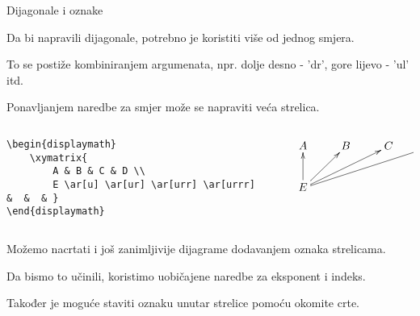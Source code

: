 \begin{frame}{Dijagonale i oznake}

Da bi napravili dijagonale, potrebno je koristiti više od jednog smjera.\newline

To se postiže kombiniranjem argumenata, npr. dolje desno - 'dr', gore lijevo - 'ul' itd.\newline

Ponavljanjem naredbe za smjer može se napraviti veća strelica.

\begin{columns}[c]

\begin{column}{0.5\textwidth}

\begin{Verbatim}[fontsize=\tiny]
\begin{displaymath}
    \xymatrix{
        A & B & C & D \\
        E \ar[u] \ar[ur] \ar[urr] \ar[urrr]      &  &  & }
\end{displaymath}
\end{Verbatim}

\end{column}

\begin{column}{0.5\textwidth}%

\begin{displaymath}
    \xymatrix{
        A & B & C & D \\
        E \ar[u] \ar[ur] \ar[urr] \ar[urrr]      &  &  & }
\end{displaymath}

\end{column}

\end{columns}

\newpage

Možemo nacrtati i još zanimljivije dijagrame dodavanjem oznaka strelicama.\newline

Da bismo to učinili, koristimo uobičajene naredbe za eksponent i indeks.\newline

Također je moguće staviti oznaku unutar strelice pomoću okomite crte.\newpage

\begin{columns}[c]

\begin{column}{0.5\textwidth}


\end{column}
\end{columns}
\end{frame}
